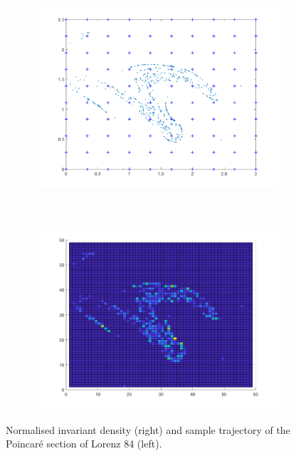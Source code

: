 \begin{figure}[H]
	\centering
	\begin{subfigure}[b]{0.4\textwidth}
		\includegraphics[width=\textwidth]{invariantl84.png}
		\label{henon0}
	\end{subfigure}
	~ %
	\begin{subfigure}[b]{0.4\textwidth}
		\includegraphics[width=\textwidth]{poincarel84map.png}
		\label{fig:tiger}
	\end{subfigure}
	\caption{\label{numerario}Normalised invariant density (right) and sample trajectory of the Poincar\'{e} section of Lorenz 84 (left).}
\end{figure}

